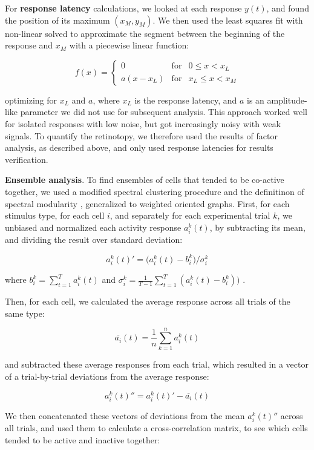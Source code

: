 \documentclass{article}
\begin{document}
For \textbf{response latency} calculations, we looked at each response $y(t)$, and found the position of its maximum $(x_M, y_M)$. We then used the least squares fit with non-linear solved to approximate the segment between the beginning of the response and $x_M$ with a piecewise linear function:

\[ f(x) = \left \{ \begin{array}{cll} 0 & \text{for} & 0 \leqslant x<x_L \\
a (x-x_L) & \text{for} & x_L\leqslant x < x_M \end{array} \right. \]

optimizing for $x_L$ and $a$, where $x_L$ is the response latency, and $a$ is an amplitude-like parameter we did not use for subsequent analysis. This approach worked well for isolated responses with low noise, but got increasingly noisy with weak signals. To quantify the retinotopy, we therefore used the results of factor analysis, as described above, and only used response latencies for results verification.

\textbf{Ensemble analysis}. To find ensembles of cells that tended to be co-active together, we used a modified spectral clustering procedure \citep{ng2002spectral} and the definitinon of spectral modularity \citep{newman2006modularity}, generalized to weighted oriented graphs. First, for each stimulus type, for each cell $i$, and separately for each experimental trial $k$, we unbiased and normalized each activity response $a^k_i(t)$, by subtracting its mean, and dividing the result over standard deviation:

\[ a^k_i(t)' = \big(a^k_i(t)-b^k_i\big)/\sigma^k_i \]

where $b^k_i = \sum_{t=1}^T{a^k_i(t)}$ and $\sigma^k_i = \frac{1}{T-1}\sum_{t=1}^T{(a^k_i(t) - b^k_i))}$ .

Then, for each cell, we calculated the average response across all trials of the same type: 

\[ \overline{a_i}(t) = \frac{1}{n}\sum_{k=1}^n{a^k_i(t)} \]

and subtracted these average responses from each trial, which resulted in a vector of a trial-by-trial deviations from the average response:

\[ a^k_i(t)'' = a^k_i(t)' - \overline{a_i}(t) \]

We then concatenated these vectors of deviations from the mean $a^k_i(t)''$ across all trials, and used them to calculate a cross-correlation matrix, to see which cells tended to be active and inactive together:
\end{document}
